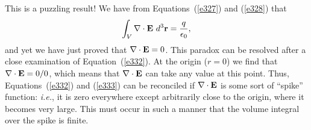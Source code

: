 This is a puzzling result! We have from Equations~(\ref{e327}) and (\ref{e328}) that 
\begin{equation}\label{e333}
\int_V \nabla \cdot{\bf E}\,\,d^3{\bf r}= \frac{q}{\epsilon_0},
\end{equation}
and yet we have just proved that $\nabla\cdot {\bf E}=0$. This paradox can be
resolved after a close examination of Equation~(\ref{e332}). At the origin
($r=0$) we find that $\nabla\cdot
{\bf E} = 0/0$, which means that $\nabla\cdot {\bf E}$
can take any value at this point. 
Thus, Equations~(\ref{e332}) and (\ref{e333}) can be reconciled
if $\nabla \cdot {\bf E}$ is some sort
of ``spike'' function: {\em i.e.}, it is zero everywhere except arbitrarily
close to the origin,
where it becomes very large. This
must occur in such a manner that the volume  integral over the spike
is finite. 

